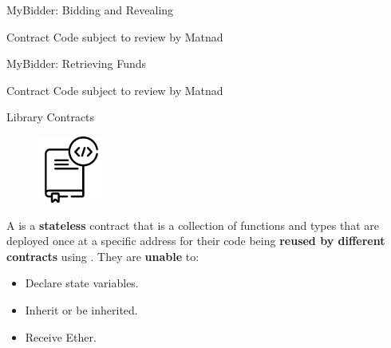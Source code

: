 \documentclass[]{beamer}
\begin{document}
\begin{frame}{MyBidder: Bidding and Revealing}

Contract Code subject to review by Matnad

\end{frame}

\begin{frame}{MyBidder: Retrieving Funds}

Contract Code subject to review by Matnad

\end{frame}

\begin{frame}{Library Contracts}

\begin{minipage}{0.25\textwidth}
	\begin{figure}
		\center
		\includegraphics[width= 2.2cm]{../assets/images/library.png}	
	\end{figure}
\end{minipage}
\begin{minipage}{0.7\textwidth}
	\vspace{1em}
	A  is a \textbf{stateless} contract that is a collection of functions and types that are deployed once at a specific address for their code being \textbf{reused by different contracts} using . They are \textbf{unable} to:

	\begin{itemize}
		\item	Declare state variables.
		\item	Inherit or be inherited.
		\item	Receive Ether.
	\end{itemize}
\end{minipage}

\vspace{1em}


\end{frame}
\end{document}
